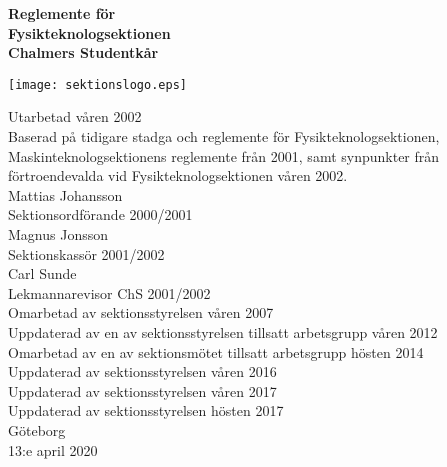 \documentclass[11pt,a4paper]{article}
\begin{document}
\thispagestyle{empty} %
\begin{center}
  \textbf{\Huge{Reglemente för}}\\[3mm]
  \textbf{\Huge{Fysikteknologsektionen}}\\
  \vspace{.7 cm}
  \textbf{\Large{Chalmers Studentkår}}

  \vspace{1.25em}
  \texttt{[image: sektionslogo.eps]}
  \vspace{1.25em}
    
    Utarbetad våren 2002\\[5mm]
    Baserad på tidigare stadga och reglemente för Fysikteknologsektionen,
    Maskinteknologsektionens reglemente från 2001, samt synpunkter
    från förtroendevalda vid Fysikteknologsektionen våren 2002.\\[4mm]
    Mattias Johansson\\
    Sektionsordförande 2000/2001\\[4mm]
    Magnus Jonsson\\
    Sektionskassör 2001/2002\\[4mm]
    Carl Sunde\\
    Lekmannarevisor ChS 2001/2002\\[4mm]
    Omarbetad av sektionsstyrelsen våren 2007\\[4mm]
    Uppdaterad av en av sektionsstyrelsen tillsatt arbetsgrupp våren 2012\\[4mm]
    Omarbetad av en av sektionsmötet tillsatt arbetsgrupp hösten 2014 \\[4mm]
    Uppdaterad av sektionsstyrelsen våren 2016 \\
    Uppdaterad av sektionsstyrelsen våren 2017 \\
    Uppdaterad av sektionsstyrelsen hösten 2017 \\
    
    \vspace{.3 cm}
    \small{Göteborg}\\
    \small{13:e april 2020}
    \vspace{2.5em} %
\end{center}
\end{document}
